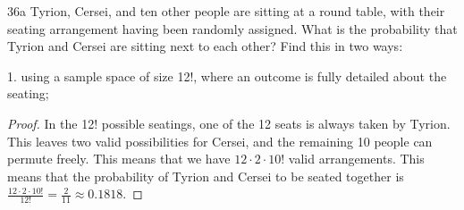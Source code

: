 \begin{exercise}{36a}
Tyrion, Cersei, and ten other people are sitting at a round table, with their seating
arrangement having been randomly assigned. What is the probability that Tyrion and
Cersei are sitting next to each other? Find this in two ways:

1. using a sample space of size 12!, where an outcome is fully detailed about the seating;
\end{exercise}

\begin{proof}
    In the 12! possible seatings, one of the 12 seats is always taken by Tyrion. This leaves two valid possibilities for Cersei, and the remaining 10 people can permute freely. This means that we have $12 \cdot 2 \cdot 10!$ valid arrangements. This means that the probability of Tyrion and Cersei to be seated together is $\frac{12 \cdot 2 \cdot 10!}{12!} = \frac{2}{11} \approx 0.1818$.
\end{proof}

